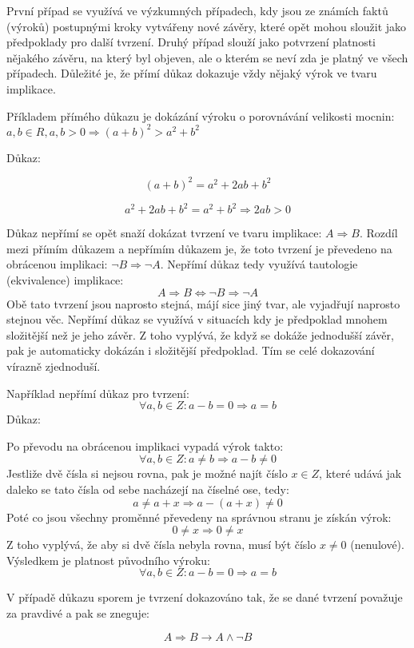 První případ se využívá ve výzkumných případech, kdy jsou ze známích faktů (výroků) postupnými kroky vytvářeny nové závěry, které opět mohou sloužit jako předpoklady pro další tvrzení. Druhý případ slouží jako potvrzení platnosti nějakého závěru, na který byl objeven, ale o kterém se neví zda je platný ve všech případech. Důležité je, že přímí důkaz dokazuje vždy nějaký výrok ve tvaru implikace.

Příkladem přímého důkazu je dokázání výroku o porovnávání velikosti mocnin: $a,b\in R, a,b>0 \Rightarrow (a+b)^2 > a^2 +b^2 $

Důkaz:

$$ (a+b)^2 = a^2 +2ab +b^2 $$

$$ a^2 + 2ab + b^2 = a^2 + b^2 \Rightarrow 2ab > 0$$


Důkaz nepřímí se opět snaží dokázat tvrzení ve tvaru implikace: $A \Rightarrow B$. Rozdíl mezi přímím důkazem a nepřímím důkazem je, že toto tvrzení je převedeno na obrácenou implikaci: $\neg B \Rightarrow \neg A $. Nepřímí důkaz tedy využívá tautologie (ekvivalence) implikace:
$$A \Rightarrow B \Leftrightarrow \neg B \Rightarrow \neg A $$
Obě tato tvrzení jsou naprosto stejná, májí sice jiný tvar, ale vyjadřují naprosto stejnou věc. Nepřímí důkaz se využívá v situacích kdy je předpoklad mnohem složitější než je jeho závěr. Z toho vyplývá, že když se dokáže jednodušší závěr, pak je automaticky dokázán i složitější předpoklad. Tím se celé dokazování vírazně zjednoduší.

Například nepřímí důkaz pro tvrzení:
$$\forall a,b \in Z: a - b = 0 \Rightarrow a = b$$
Důkaz:

Po převodu na obrácenou implikaci vypadá výrok takto: 
$$\forall a,b \in Z:a \not = b \Rightarrow a - b \not = 0$$
Jestliže dvě čísla si nejsou rovna, pak je možné najít číslo $x \in Z$, které udává jak daleko se tato čísla od sebe nacházejí na číselné ose, tedy:
$$a \not = a+ x \Rightarrow a - (a+x) \not = 0$$
Poté co jsou všechny proměnné převedeny na správnou stranu je získán výrok: 
$$0 \not = x \Rightarrow 0 \not = x$$
Z toho vyplývá, že aby si dvě čísla nebyla rovna, musí být číslo $x \not =0$ (nenulové). Výsledkem je platnost původního výroku:
$$ \forall a,b \in Z: a-b=0 \Rightarrow a = b $$


V případě důkazu sporem je tvrzení dokazováno tak, že se dané tvrzení považuje za pravdivé a pak se zneguje:

$$A\Rightarrow B \rightarrow A \wedge \neg B $$

